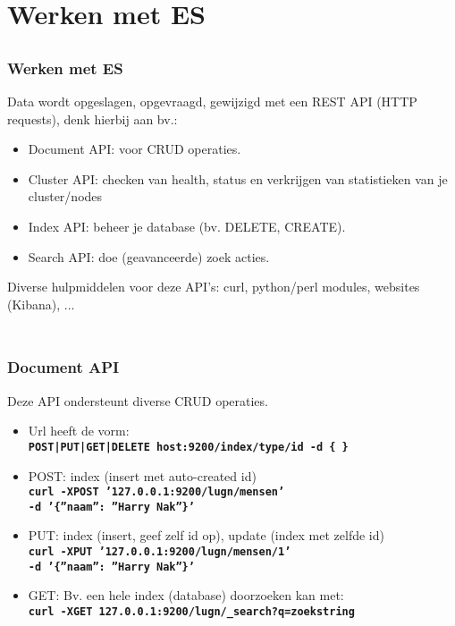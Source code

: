 \section{Werken met ES}
\subsection{}
\begin{styleframe}
	\frametitle{Werken met ES}
\pause
Data wordt opgeslagen, opgevraagd, gewijzigd met een REST API (HTTP requests), denk hierbij aan bv.:
\begin{itemize}[<+>]
	\item Document API: voor CRUD operaties.
	\item Cluster API: checken van health, status en verkrijgen van statistieken van je cluster/nodes
	\item Index API: beheer je database (bv. DELETE, CREATE).
	\item Search API: doe (geavanceerde) zoek acties.
\end{itemize}
\pause
Diverse hulpmiddelen voor deze API's: curl, python/perl modules, websites (Kibana), ...\\\
\end{styleframe}

\subsection{}
\begin{styleframefrag}
	\frametitle{Document API}
Deze API ondersteunt diverse CRUD operaties.
\begin{itemize}[<+>]
	\item Url heeft de vorm:\\
{\scriptsize {\tt \textbf{\hspace{1em}POST|PUT|GET|DELETE host:9200/index/type/id -d \{ \} }}}
	\item POST: index (insert met auto-created id)\\
{\scriptsize {\tt \textbf{\hspace{1em}curl -XPOST '127.0.0.1:9200/lugn/mensen'}}}\\
{\scriptsize {\tt \textbf{\hspace{2em}-d '\{''naam'': ''Harry Nak''\}'}}}
	\item PUT: index (insert, geef zelf id op), update (index met zelfde id)\\
{\scriptsize {\tt \textbf{\hspace{1em}curl -XPUT '127.0.0.1:9200/lugn/mensen/1'}}}\\
{\scriptsize {\tt \textbf{\hspace{2em}-d '\{''naam'': ''Harry Nak''\}'}}}
	\item GET: Bv. een hele index (database) doorzoeken kan met:\\
{\scriptsize {\tt \textbf{\hspace{1em}curl -XGET 127.0.0.1:9200/lugn/\_search?q=zoekstring}}}
\end{itemize}
\end{styleframefrag}

